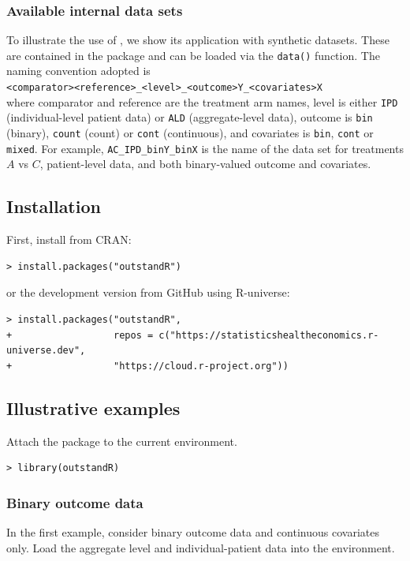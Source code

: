\documentclass[article]{jss}
\begin{document}
\subsubsection{Available internal data sets}
To illustrate the use of , we show its application with synthetic datasets. These are contained in the  package and can be loaded via the \texttt{data()} function. The naming convention adopted is \newline \\
\texttt{<comparator><reference>\_<level>\_<outcome>Y\_<covariates>X} \newline
\\
where comparator and reference are the treatment arm names, level is either \texttt{IPD} (individual-level patient data) or \texttt{ALD} (aggregate-level data), outcome is \texttt{bin} (binary), \texttt{count} (count) or \texttt{cont} (continuous), and covariates is \texttt{bin}, \texttt{cont} or \texttt{mixed}. For example, \texttt{AC\_IPD\_binY\_binX} is the name of the data set for treatments $A$ vs $C$, patient-level data, and both binary-valued outcome and covariates.

\subsection{Installation}
First, install  from CRAN: 

\begin{verbatim}
> install.packages("outstandR")
\end{verbatim}
or the development version from GitHub using R-universe:
\begin{verbatim}
> install.packages("outstandR",
+                  repos = c("https://statisticshealtheconomics.r-universe.dev",
+                  "https://cloud.r-project.org"))
\end{verbatim}


\subsection{Illustrative examples}
Attach the package to the current environment.

\begin{verbatim}
> library(outstandR)
\end{verbatim}

%
\subsubsection{Binary outcome data}
In the first example, consider binary outcome data and continuous covariates only.
Load the aggregate level and individual-patient data into the environment.
\end{document}
